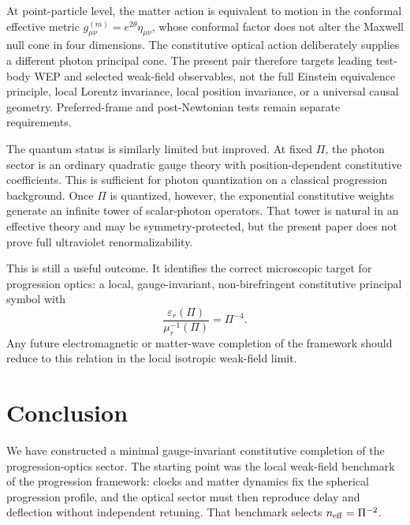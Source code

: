 \documentclass[12pt]{article}
\begin{document}
At point-particle level, the matter action is equivalent to motion in the conformal effective metric \(g_{\mu\nu}^{(m)}=e^{2\theta}\eta_{\mu\nu}\), whose conformal factor does not alter the Maxwell null cone in four dimensions.  The constitutive optical action deliberately supplies a different photon principal cone.  The present pair therefore targets leading test-body WEP and selected weak-field observables, not the full Einstein equivalence principle, local Lorentz invariance, local position invariance, or a universal causal geometry.  Preferred-frame and post-Newtonian tests remain separate requirements.

The quantum status is similarly limited but improved.  At fixed $\Pi$, the photon sector is an ordinary quadratic gauge theory with position-dependent constitutive coefficients.  This is sufficient for photon quantization on a classical progression background.  Once $\Pi$ is quantized, however, the exponential constitutive weights generate an infinite tower of scalar-photon operators.  That tower is natural in an effective theory and may be symmetry-protected, but the present paper does not prove full ultraviolet renormalizability.

This is still a useful outcome.  It identifies the correct microscopic target for progression optics: a local, gauge-invariant, non-birefringent constitutive principal symbol with
\begin{equation}
 \frac{\varepsilon_r(\Pi)}{\mu_r^{-1}(\Pi)}=\Pi^{-4}.
\label{eq:ratio_target}
\end{equation}
Any future electromagnetic or matter-wave completion of the framework should reduce to this relation in the local isotropic weak-field limit.

\section{Conclusion}
\label{sec:conclusion}

We have constructed a minimal gauge-invariant constitutive completion of the progression-optics sector.  The starting point was the local weak-field benchmark of the progression framework: clocks and matter dynamics fix the spherical progression profile, and the optical sector must then reproduce delay and deflection without independent retuning.  That benchmark selects $n_{\rm eff}=\Pi^{-2}$.
\end{document}
